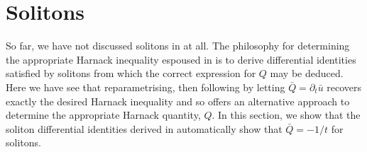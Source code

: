 \documentclass{amsart}
\begin{document}
\section{Solitons}
\label{sec:solitons}


So far, we have not discussed solitons in at all. The philosophy for determining the appropriate Harnack inequality espoused in \cite{Hamilton:/1993} is to derive differential identities satisfied by solitons from which the correct expression for \(Q\) may be deduced. Here we have see that reparametrising, then following \cite{LiYau:/1986} by letting \(\bar{Q} = \partial_t \bar{u}\) recovers exactly the desired Harnack inequality and so offers an alternative approach to determine the appropriate Harnack quantity, \(Q\). In this section, we show that the soliton differential identities derived in \cite{Hamilton:/1993} automatically show that \(\bar{Q} = -1/t\) for solitons.
\end{document}
